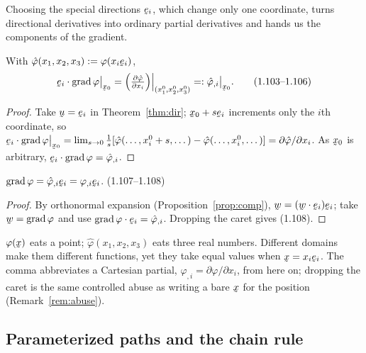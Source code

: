 Choosing the special directions $\be_i$, which change only one coordinate,
turns directional derivatives into ordinary partial derivatives and hands
us the components of the gradient.

\begin{corollary}\label{cor:partial}
With $\hat\varphi(x_1,x_2,x_3):=\varphi(x_i\be_i)$,
\begin{equation}
\be_i\cdot\grad\varphi\rest{\bx_0}
=\Big(\tfrac{\partial\hat\varphi}{\partial x_i}\Big)
\Big|_{(x_1^0,x_2^0,x_3^0)}=:\hat\varphi_{,i}\rest{\bx_0}. \tag{1.103--1.106}\label{eq:1.103}
\end{equation}
\end{corollary}

\begin{proof}
Take $\bu=\be_i$ in Theorem~\ref{thm:dir}; $\bx_0+s\be_i$ increments only
the $i$th coordinate, so
$\be_i\cdot\grad\varphi\rest{\bx_0}=\lim_{s\to0}\tfrac1s[
\hat\varphi(\dots,x_i^0+s,\dots)-\hat\varphi(\dots,x_i^0,\dots)]
=\partial\hat\varphi/\partial x_i$. As $\bx_0$ is arbitrary,
$\be_i\cdot\grad\varphi=\hat\varphi_{,i}$.
\end{proof}

\begin{theorem}\label{thm:cart}
$\grad\varphi=\hat\varphi_{,i}\be_i=\varphi_{,i}\be_i$.
\hfill\textup{(1.107--1.108)}
\end{theorem}

\begin{proof}
By orthonormal expansion (Proposition~\ref{prop:comp}),
$\bw=(\ip\bw{\be_i})\be_i$; take $\bw=\grad\varphi$ and use
$\ip{\grad\varphi}{\be_i}=\hat\varphi_{,i}$. Dropping the caret gives
(1.108).
\end{proof}

\begin{remark}\label{rem:caret}
$\varphi(\bx)$ eats a point; $\hat\varphi(x_1,x_2,x_3)$ eats three real
numbers. Different domains make them different functions, yet they take
equal values when $\bx=x_i\be_i$. The comma abbreviates a Cartesian
partial, $\varphi_{,i}=\partial\varphi/\partial x_i$, from here on;
dropping the caret is the same controlled abuse as writing a bare $\bx$ for
the position (Remark~\ref{rem:abuse}).
\end{remark}

\subsection{Parameterized paths and the chain rule}\label{ss:chain}

